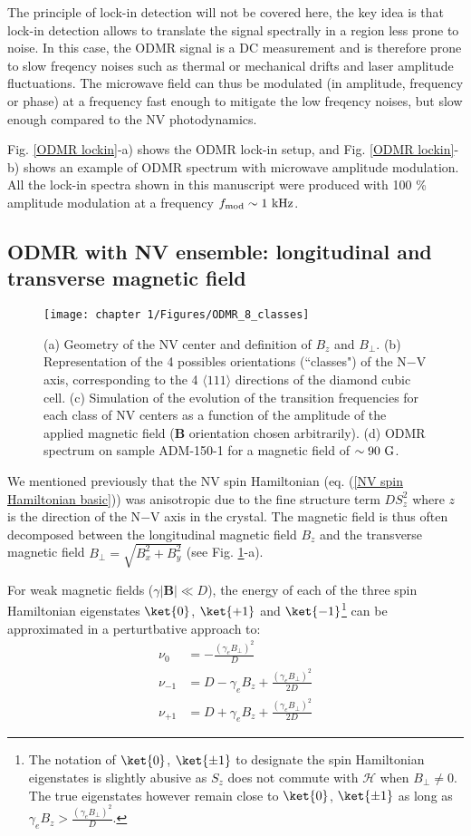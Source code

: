 \documentclass[a4paper, 11pt]{book}
\begin{document}
The principle of lock-in detection will not be covered here, the key idea is that lock-in detection allows to translate the signal spectrally in a region less prone to noise. In this case, the ODMR signal is a DC measurement and is therefore prone to slow freqency noises such as thermal or mechanical drifts and laser amplitude fluctuations. The microwave field can thus be modulated (in amplitude, frequency or phase) at a frequency fast enough to mitigate the low freqency noises, but slow enough compared to the NV photodynamics. 

Fig. \ref{ODMR lockin}-a) shows the ODMR lock-in setup, and Fig. \ref{ODMR lockin}-b) shows an example of ODMR spectrum with microwave amplitude modulation. All the lock-in spectra shown in this manuscript were produced with 100 \% amplitude modulation at a frequency $f_{\rm mod} \sim 1\ \rm kHz$.

\subsection{ODMR with NV ensemble: longitudinal and transverse magnetic field}

\begin{figure}[h!]
\centering
\texttt{[image: chapter 1/Figures/ODMR\_8\_classes]}
\caption{(a) Geometry of the NV center and definition of $B_z$ and $B_\perp$. (b) Representation of the 4 possibles orientations (``classes") of the N$-$V axis, corresponding to the 4 $\langle 111 \rangle$ directions of the diamond cubic cell. (c) Simulation of the evolution of the transition frequencies for each class of NV centers as a function of the amplitude of the applied magnetic field ($\textbf{B}$ orientation chosen arbitrarily). (d) ODMR spectrum on sample ADM-150-1 for a magnetic field of $\sim 90\ \rm G$.}
\label{ODMR 8 classes}
\end{figure}

We mentioned previously that the NV spin Hamiltonian (eq. (\ref{NV spin Hamiltonian basic})) was anisotropic due to the fine structure term $D S_z^2$ where $z$ is the direction of the N$-$V axis in the crystal. The magnetic field is thus often decomposed between the longitudinal magnetic field $B_z$ and the transverse magnetic field $B_\perp=\sqrt{B_x^2+B_y^2}$ (see Fig. \ref{ODMR 8 classes}-a). 

For weak magnetic fields ($\gamma |\textbf{B}| \ll D$), the energy of each of the three spin Hamiltonian eigenstates $\ket{0}$, $\ket{+1}$ and $\ket{-1}$\footnote{The notation of $\ket{0}$, $\ket{\pm 1}$ to designate the spin Hamiltonian eigenstates is slightly abusive as $S_z$ does not commute with $\mathcal{H}$ when $B_\perp \neq 0$. The true eigenstates however remain close to $\ket{0}$, $\ket{\pm 1}$ as long as $\gamma_e B_z > \frac{(\gamma_e B_\perp)^2}{D}$.} can be approximated in a perturtbative approach to: %
\begin{align}
\nu_0&= -\frac{(\gamma_e B_\perp)^2}{D} \\
\nu_{-1} &= D - \gamma_e B_z + \frac{(\gamma_e B_\perp)^2}{2D} \\
\nu_{+1} &= D + \gamma_e B_z + \frac{(\gamma_e B_\perp)^2}{2D}
\end{align}
\end{document}
